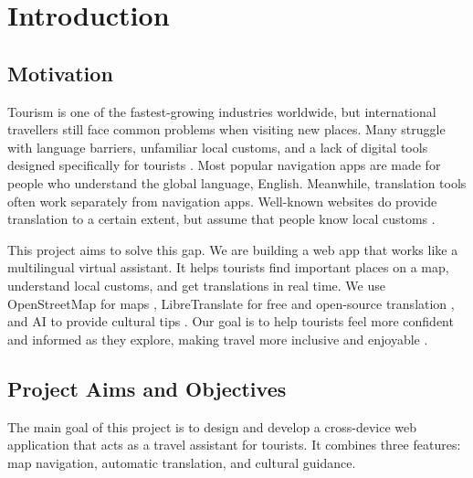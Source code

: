 \chapter{Introduction}

\section{Motivation}

Tourism is one of the fastest-growing industries worldwide, but international travellers still face common problems when visiting new places. Many struggle with language barriers, unfamiliar local customs, and a lack of digital tools designed specifically for tourists \cite{Liebling2020}. Most popular navigation apps are made for people who understand the global language, English. Meanwhile, translation tools often work separately from navigation apps. Well-known websites do provide translation to a certain extent, but assume that people know local customs \cite{navUX,localizationUX}.

This project aims to solve this gap. We are building a web app that works like a multilingual virtual assistant. It helps tourists find important places on a map, understand local customs, and get translations in real time. We use OpenStreetMap for maps \cite{osm}, LibreTranslate for free and open-source translation \cite{libretranslate}, and AI to provide cultural tips \cite{cultureai}. Our goal is to help tourists feel more confident and informed as they explore, making travel more inclusive and enjoyable \cite{inclusiveTourism}.

\section{Project Aims and Objectives}

The main goal of this project is to design and develop a cross-device web application that acts as a travel assistant for tourists. It combines three features: map navigation, automatic translation, and cultural guidance.


